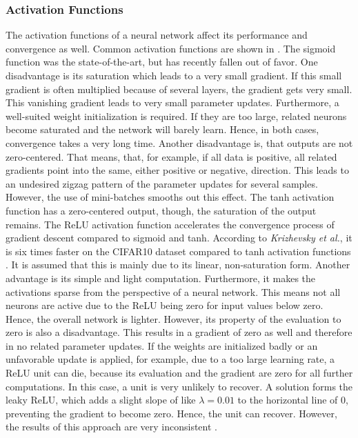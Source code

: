 \subsubsection{Activation Functions}
\label{sec:improving-performance-activation-functions}
The activation functions of a neural network affect its performance and convergence as well.
Common activation functions are shown in .
The sigmoid function was the state-of-the-art, but has recently fallen out of favor.
One disadvantage is its saturation which leads to a very small gradient.
If this small gradient is often multiplied because of several layers, the gradient gets very small.
This vanishing gradient leads to very small parameter updates.
Furthermore, a well-suited weight initialization is required.
If they are too large, related neurons become saturated and the network will barely learn.
Hence, in both cases, convergence takes a very long time.
Another disadvantage is, that outputs are not zero-centered.
That means, that, for example, if all data is positive, all related gradients point into the same, either positive or negative, direction.
This leads to an undesired zigzag pattern of the parameter updates for several samples.
However, the use of mini-batches smooths out this effect.
The tanh activation function has a zero-centered output, though, the saturation of the output remains.
The ReLU activation function accelerates the convergence process of gradient descent compared to sigmoid and tanh.
According to \textit{Krizhevsky et al.}, it is six times faster on the CIFAR10 dataset \cite{Krizhevsky2009LearningML} compared to tanh activation functions \cite{Krizhevsky:2012:ICD:2999134.2999257}.
It is assumed that this is mainly due to its linear, non-saturation form.
Another advantage is its simple and light computation.
Furthermore, it makes the activations sparse from the perspective of a neural network.
This means not all neurons are active due to the ReLU being zero for input values below zero.
Hence, the overall network is lighter.
However, its property of the evaluation to zero is also a disadvantage.
This results in a gradient of zero as well and therefore in no related parameter updates.
If the weights are initialized badly or an unfavorable update is applied, for example, due to a too large learning rate, a ReLU unit can die, because its evaluation and the gradient are zero for all further computations.
In this case, a unit is very unlikely to recover.
A solution forms the leaky ReLU, which adds a slight slope of like $\lambda = 0.01$ to the horizontal line of 0, preventing the gradient to become zero.
Hence, the unit can recover.
However, the results of this approach are very inconsistent \cite{cs231n}.

